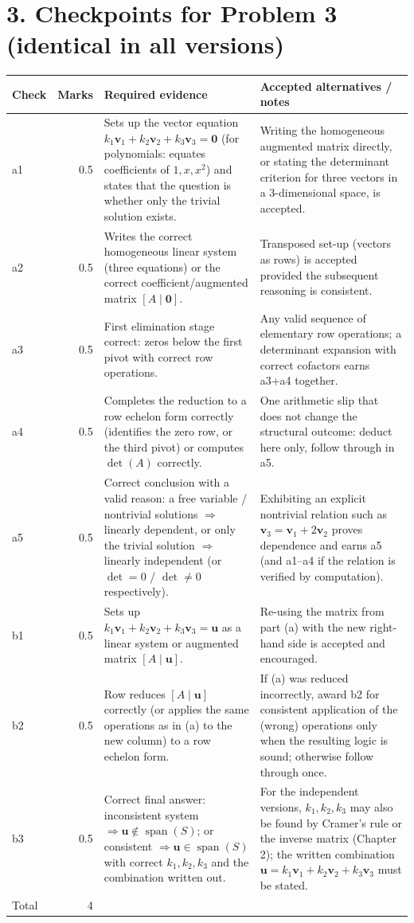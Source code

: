\documentclass[11pt,a4paper]{article}
\begin{document}
\section*{3. Checkpoints for Problem 3 (identical in all versions)}
\begin{tabularx}{\linewidth}{@{}l r X X@{}}\toprule Check & Marks & Required evidence & Accepted alternatives / notes\\\midrule
a1 & 0.5 & Sets up the vector equation $k_1\mathbf{v}_1+k_2\mathbf{v}_2+k_3\mathbf{v}_3=\mathbf{0}$ (for polynomials: equates coefficients of $1,x,x^2$) and states that the question is whether only the trivial solution exists. & Writing the homogeneous augmented matrix directly, or stating the determinant criterion for three vectors in a 3-dimensional space, is accepted.\\
a2 & 0.5 & Writes the correct homogeneous linear system (three equations) or the correct coefficient/augmented matrix $[A\mid\mathbf{0}]$. & Transposed set-up (vectors as rows) is accepted provided the subsequent reasoning is consistent.\\
a3 & 0.5 & First elimination stage correct: zeros below the first pivot with correct row operations. & Any valid sequence of elementary row operations; a determinant expansion with correct cofactors earns a3+a4 together.\\
a4 & 0.5 & Completes the reduction to a row echelon form correctly (identifies the zero row, or the third pivot) or computes $\det(A)$ correctly. & One arithmetic slip that does not change the structural outcome: deduct here only, follow through in a5.\\
a5 & 0.5 & Correct conclusion with a valid reason: a free variable / nontrivial solutions $\Rightarrow$ linearly dependent, or only the trivial solution $\Rightarrow$ linearly independent (or $\det=0$ / $\det\neq0$ respectively). & Exhibiting an explicit nontrivial relation such as $\mathbf{v}_3=\mathbf{v}_1+2\mathbf{v}_2$ proves dependence and earns a5 (and a1--a4 if the relation is verified by computation).\\
b1 & 0.5 & Sets up $k_1\mathbf{v}_1+k_2\mathbf{v}_2+k_3\mathbf{v}_3=\mathbf{u}$ as a linear system or augmented matrix $[A\mid\mathbf{u}]$. & Re-using the matrix from part (a) with the new right-hand side is accepted and encouraged.\\
b2 & 0.5 & Row reduces $[A\mid\mathbf{u}]$ correctly (or applies the same operations as in (a) to the new column) to a row echelon form. & If (a) was reduced incorrectly, award b2 for consistent application of the (wrong) operations only when the resulting logic is sound; otherwise follow through once.\\
b3 & 0.5 & Correct final answer: inconsistent system $\Rightarrow\mathbf{u}\notin\operatorname{span}(S)$; or consistent $\Rightarrow\mathbf{u}\in\operatorname{span}(S)$ with correct $k_1,k_2,k_3$ and the combination written out. & For the independent versions, $k_1,k_2,k_3$ may also be found by Cramer's rule or the inverse matrix (Chapter 2); the written combination $\mathbf{u}=k_1\mathbf{v}_1+k_2\mathbf{v}_2+k_3\mathbf{v}_3$ must be stated.\\
\midrule Total & 4 & & \\\bottomrule\end{tabularx}
\end{document}
